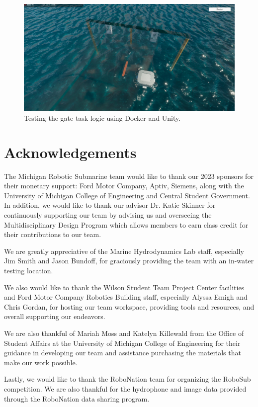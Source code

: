 \documentclass[conference]{IEEEtran}
\begin{document}
    \begin{figure}[htbp]
    \centerline{\includegraphics[scale=0.2]{images/unity_new.jpg}}
    \caption{Testing the gate task logic using Docker and Unity.}
    \label{fig:unity}
    \end{figure}

\section*{Acknowledgements}

The Michigan Robotic Submarine team would like to thank our 2023 sponsors for their monetary support: Ford Motor Company, Aptiv, Siemens, along with the University of Michigan College of Engineering and Central Student Government. In addition, we would like to thank our advisor Dr. Katie Skinner for continuously supporting our team by advising us and overseeing the Multidisciplinary Design Program which allows members to earn class credit for their contributions to our team.

We are greatly appreciative of the Marine Hydrodynamics Lab staff, especially Jim Smith and Jason Bundoff, for graciously providing the team with an in-water testing location. 

We also would like to thank the Wilson Student Team Project Center facilities and Ford Motor Company Robotics Building staff, especially Alyssa Emigh and Chris Gordan, for hosting our team workspace, providing tools and resources, and overall supporting our endeavors. 

We are also thankful of Mariah Moss and Katelyn Killewald from the Office of Student Affairs at the University of Michigan College of Engineering for their guidance in developing our team and assistance purchasing the materials that make our work possible. 

Lastly, we would like to thank the RoboNation team for organizing the RoboSub competition. We are also thankful for the hydrophone and image data provided through the RoboNation data sharing program.
\end{document}
